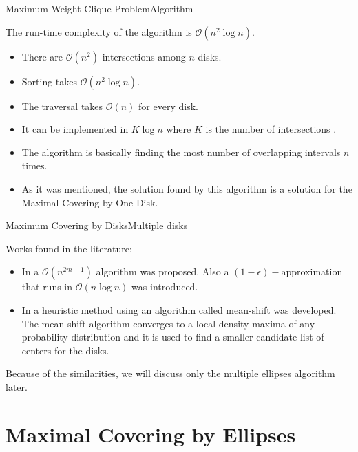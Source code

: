 \documentclass{beamer}
\newcommand{\bigO}{\mathscr{O}}
\begin{document}
\begin{frame}{Maximum Weight Clique Problem}{Algorithm}
	
	The run-time complexity of the algorithm is $\bigO(n^2\log{n})$.
	
	\begin{itemize}
		\item There are $\bigO(n^2)$ intersections among $n$ disks.
		
		\item Sorting takes $\bigO(n^2\log{n})$.
		
		\item The traversal takes $\bigO(n)$ for every disk.
		
		\item It can be implemented in $K\log{n}$ where $K$ is the number of intersections \autocite{bentley:1979}.
		
		\item The algorithm is basically finding the most number of overlapping intervals $n$ times.
		
		\item As it was mentioned, the solution found by this algorithm is a solution for the Maximal Covering by One Disk.
	\end{itemize}

\end{frame}

\begin{frame}{Maximum Covering by Disks}{Multiple disks}
	
	Works found in the literature:
	
	\begin{itemize}
		\item In \autocite{cabello:2006} a $\bigO(n^{2m-1})$ algorithm was proposed. Also a $(1-\epsilon)-$approximation that runs in $\bigO(n\log{n})$ was introduced.
		
		\item In \autocite{zhou} a heuristic method using an algorithm called mean-shift was developed. The mean-shift algorithm converges to a local density maxima of any probability distribution and it is used to find a smaller candidate list of centers for the disks.
	\end{itemize}
	
	Because of the similarities, we will discuss only the multiple ellipses algorithm later.
	
\end{frame}
\section{Maximal Covering by Ellipses}
\end{document}

